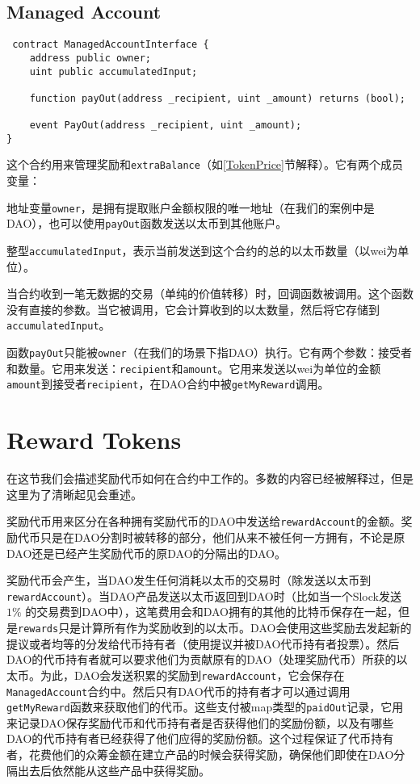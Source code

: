 \documentclass[9pt,oneside]{amsart}
\begin{document}
\subsection{Managed Account}
\begin{verbatim}
 contract ManagedAccountInterface {
    address public owner;
    uint public accumulatedInput;

    function payOut(address _recipient, uint _amount) returns (bool);

    event PayOut(address _recipient, uint _amount);
}
\end{verbatim}
\begin{multicols}{2}
这个合约用来管理奖励和\verb|extraBalance|（如\ref{TokenPrice}节解释）。它有两个成员变量：

地址变量\verb|owner|，是拥有提取账户金额权限的唯一地址（在我们的案例中是DAO），也可以使用\verb|payOut|函数发送以太币到其他账户。

整型\verb|accumulatedInput|，表示当前发送到这个合约的总的以太币数量（以wei为单位）。

当合约收到一笔无数据的交易（单纯的价值转移）时，回调函数被调用。这个函数没有直接的参数。当它被调用，它会计算收到的以太数量，然后将它存储到\verb|accumulatedInput|。

函数\verb|payOut|只能被\verb|owner|（在我们的场景下指DAO）执行。它有两个参数：接受者和数量。它用来发送：\verb|recipient|和\verb|amount|。它用来发送以wei为单位的金额\verb|amount|到接受者\verb|recipient|，在DAO合约中被\verb|getMyReward|调用。

\section{Reward Tokens} \label{RewardToken}

在这节我们会描述奖励代币如何在合约中工作的。多数的内容已经被解释过，但是这里为了清晰起见会重述。

奖励代币用来区分在各种拥有奖励代币的DAO中发送给\verb|rewardAccount|的金额。奖励代币只是在DAO分割时被转移的部分，他们从来不被任何一方拥有，不论是原DAO还是已经产生奖励代币的原DAO的分隔出的DAO。

奖励代币会产生，当DAO发生任何消耗以太币的交易时（除发送以太币到\verb|rewardAccount|）。当DAO产品发送以太币返回到DAO时（比如当一个Slock发送 $1\%$ 的交易费到DAO中），这笔费用会和DAO拥有的其他的比特币保存在一起，但是\verb|rewards|只是计算所有作为奖励收到的以太币。DAO会使用这些奖励去发起新的提议或者均等的分发给代币持有者（使用提议并被DAO代币持有者投票）。然后DAO的代币持有者就可以要求他们为贡献原有的DAO（处理奖励代币）所获的以太币。为此，DAO会发送积累的奖励到\verb|rewardAccount|，它会保存在\verb|ManagedAccount|合约中。然后只有DAO代币的持有者才可以通过调用\verb|getMyReward|函数来获取他们的代币。这些支付被map类型的\verb|paidOut|记录，它用来记录DAO保存奖励代币和代币持有者是否获得他们的奖励份额，以及有哪些DAO的代币持有者已经获得了他们应得的奖励份额。这个过程保证了代币持有者，花费他们的众筹金额在建立产品的时候会获得奖励，确保他们即使在DAO分隔出去后依然能从这些产品中获得奖励。


\end{multicols}
\end{document}
